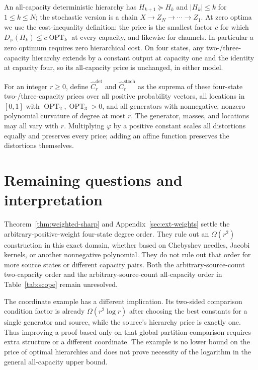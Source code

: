 \documentclass[11pt]{article}
\theoremstyle{definition}\newtheorem{definition}[theorem]{Definition}
\theoremstyle{remark}\newtheorem{remark}[theorem]{Remark}
\newcommand{\OPT}{\operatorname{OPT}}
\newcommand{\detp}{\mathrm{det}}
\newcommand{\stp}{\mathrm{stoch}}
\begin{document}


An all-capacity deterministic hierarchy has $H_{k+1}\succeq H_k$ and
$|H_k|\le k$ for $1\le k\le N$; the stochastic version is a chain
$X\to Z_N\to\cdots\to Z_1$. At zero optima we use the cost-inequality
definition: the price is the smallest factor $c$ for which
$D_\varphi(H_k)\le c\OPT_k$ at every capacity, and likewise for channels.
In particular a zero optimum requires zero hierarchical cost. On four
states, any two-/three-capacity hierarchy extends by a constant output at
capacity one and the identity at capacity four, so its all-capacity price
is unchanged, in either model.

For an integer $r\ge0$, define $\widehat C_r^{\detp}$ and
$\widehat C_r^{\stp}$ as the suprema of these four-state two-/three-capacity
prices over all positive probability vectors, all locations in $[0,1]$
with $\OPT_2,\OPT_3>0$, and all generators with nonnegative, nonzero
polynomial curvature of degree at most $r$. The generator, masses, and
locations may all vary with $r$. Multiplying $\varphi$ by a positive
constant scales all distortions equally and preserves every price;
adding an affine function preserves the distortions themselves.







\section{Remaining questions and interpretation}
Theorem~\ref{thm:weighted-sharp} and Appendix~\ref{sec:ext-weights} settle
the arbitrary-positive-weight four-state degree order. They rule out an
$\Omega(r^2)$ construction in this exact domain, whether based on
Chebyshev needles, Jacobi kernels, or another nonnegative polynomial.
They do not rule out that order for more source states or different
capacity pairs. Both the arbitrary-source-count two-capacity order and
the arbitrary-source-count all-capacity order in Table~\ref{tab:scope}
remain unresolved.

The coordinate example has a different implication. Its two-sided
comparison condition factor is already $\Omega(r^2\log r)$ after choosing
the best constants for a single generator and source, while the source's
hierarchy price is exactly one. Thus improving a proof based only on
that global partition comparison requires extra structure or a different
coordinate. The example is no lower bound on the price of optimal
hierarchies and does not prove necessity of the logarithm in the
general all-capacity upper bound.
\end{document}
